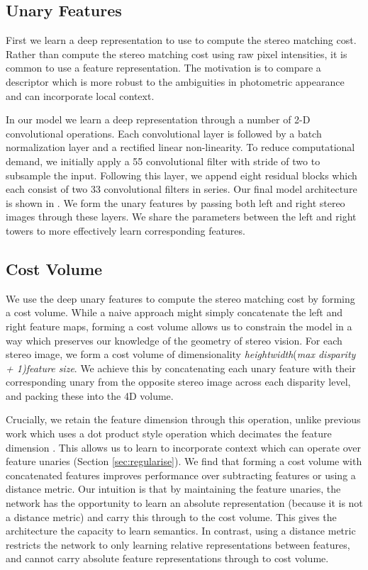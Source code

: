 \documentclass[10pt,twocolumn,letterpaper]{article}
\begin{document}
\subsection{Unary Features}
\label{sec:unary}

First we learn a deep representation to use to compute the stereo matching cost. Rather than compute the stereo matching cost using raw pixel intensities, it is common to use a feature representation. The motivation is to compare a descriptor which is more robust to the ambiguities in photometric appearance and can incorporate local context.

In our model we learn a deep representation through a number of 2-D convolutional operations. Each convolutional layer is followed by a batch normalization layer and a rectified linear non-linearity. To reduce computational demand, we initially apply a 55 convolutional filter with stride of two to subsample the input. Following this layer, we append eight residual blocks \cite{he2015deep} which each consist of two 33 convolutional filters in series. Our final model architecture is shown in . We form the unary features by passing both left and right stereo images through these layers. We share the parameters between the left and right towers to more effectively learn corresponding features.

\subsection{Cost Volume}
\label{sec:cost_vol}

We use the deep unary features to compute the stereo matching cost by forming a cost volume. While a naive approach might simply concatenate the left and right feature maps, forming a cost volume allows us to constrain the model in a way which preserves our knowledge of the geometry of stereo vision. For each stereo image, we form a cost volume of dimensionality {\it height}{\it width}{(\it max disparity + 1)}{\it feature size}. We achieve this by concatenating each unary feature with their corresponding unary from the opposite stereo image across each disparity level, and packing these into the 4D volume. 

Crucially, we retain the feature dimension through this operation, unlike previous work which uses a dot product style operation which decimates the feature dimension \cite{luo2016efficient}. This allows us to learn to incorporate context which can operate over feature unaries (Section \ref{sec:regularise}). We find that forming a cost volume with concatenated features improves performance over subtracting features or using a distance metric. Our intuition is that by maintaining the feature unaries, the network has the opportunity to learn an absolute representation (because it is not a distance metric) and carry this through to the cost volume. This gives the architecture the capacity to learn semantics. In contrast, using a distance metric restricts the network to only learning relative representations between features, and cannot carry absolute feature representations through to cost volume.
\end{document}
